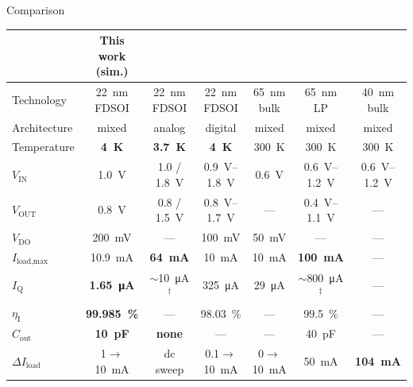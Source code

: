 \documentclass[aspectratio=169, t, 9pt]{beamer} %
\begin{document}
\begin{frame}{Comparison}
\vspace{-0.1cm}
\begin{table}[t] \centering \scriptsize
\setlength{\tabcolsep}{2.2pt}
\renewcommand{\arraystretch}{0.8}
\begin{tabular}{@{}l|c|c|c|c|c|c@{}}
\hline
& \textbf{This work (sim.)} & \cite{Andrade2021} & \cite{ashok2025} & \cite{Huang2020} & \cite{Kundu2019} & \cite{Song2021} \\
\hline
Technology & \SI{22}{\nano\meter} FDSOI & \SI{22}{\nano\meter} FDSOI & \SI{22}{\nano\meter} FDSOI & \SI{65}{\nano\meter} bulk & \SI{65}{\nano\meter} LP & \SI{40}{\nano\meter} bulk \\
\hline
Architecture & mixed & analog & digital & mixed & mixed & mixed \\
\hline
Temperature & \textbf{\SI{4}{\kelvin}} & \textbf{\SI{3.7}{\kelvin}} & \textbf{\SI{4}{\kelvin}} & \SI{300}{\kelvin} & \SI{300}{\kelvin} & \SI{300}{\kelvin} \\
\hline
$V_\text{IN}$ & \SI{1.0}{\volt} & 1.0 / \SI{1.8}{\volt} & \SIrange{0.9}{1.8}{\volt} & \SI{0.6}{\volt} & \SIrange{0.6}{1.2}{\volt} & \SIrange{0.6}{1.2}{\volt} \\
\hline
$V_\text{OUT}$ & \SI{0.8}{\volt} & 0.8 / \SI{1.5}{\volt} & \SIrange{0.8}{1.7}{\volt} & --- & \SIrange{0.4}{1.1}{\volt} & --- \\
\hline
$V_\text{DO}$ & \SI{200}{\milli\volt} & --- & \SI{100}{\milli\volt} & \SI{50}{\milli\volt} & --- & --- \\
\hline
$I_\text{load,max}$ & \SI{10.9}{\milli\ampere} & \textbf{\SI{64}{\milli\ampere}} & \SI{10}{\milli\ampere} & \SI{10}{\milli\ampere} & \textbf{\SI{100}{\milli\ampere}} & --- \\
\hline
$I_\text{Q}$ & \textbf{\SI{1.65}{\micro\ampere}} & $\sim$\SI{10}{\micro\ampere}$^{\dagger}$ & \SI{325}{\micro\ampere} & \SI{29}{\micro\ampere} & $\sim$\SI{800}{\micro\ampere}$^{\ddagger}$ & --- \\
\hline
$\eta_\text{I}$ & \textbf{\SI{99.985}{\percent}} & --- & \SI{98.03}{\percent} & --- & \SI{99.5}{\percent} & --- \\
\hline
$C_\text{out}$ & \textbf{\SI{10}{\pico\farad}} & \textbf{none} & --- & --- & \SI{40}{\pico\farad} & --- \\
\hline
$\Delta I_\text{load}$ & \SI{1}{}$\to$\SI{10}{\milli\ampere} & dc sweep & \SI{0.1}{}$\to$\SI{10}{\milli\ampere} & \SI{0}{}$\to$\SI{10}{\milli\ampere} & \SI{50}{\milli\ampere} & \textbf{\SI{104}{\milli\ampere}} \\

\end{tabular}
\end{table}
\end{frame}
\end{document}
